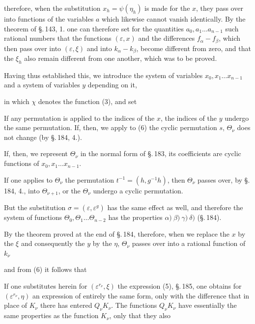 
therefore, when the substitution $x_h = \psi(\eta_h)$ is made for the $x$, they pass over into functions of the variables $a$ which likewise cannot vanish identically. By the theorem of \S.\,143, 1. one can therefore set for the quantities $a_0, a_1 \ldots a_{n-1}$ such rational numbers that the functions $(\varepsilon, x)$ and the differences $f_\alpha - f_\beta$, which then pass over into $(\varepsilon, \xi)$ and into $k_\alpha - k_\beta$, become different from zero, and that the $\xi_h$ also remain different from one another, which was to be proved.

Having thus established this, we introduce the system of variables $x_0, x_1 \ldots x_{n-1}$ and a system of variables $y$ depending on it,


in which $\chi$ denotes the function (3), and set


If any permutation is applied to the indices of the $x$, the indices of the $y$ undergo the same permutation. If, then, we apply to (6) the cyclic permutation $s$, $\Theta_\nu$ does not change (by \S.\,184, 4.).

If, then, we represent $\Theta_\nu$ in the normal form of \S.\,183, its coefficients are cyclic functions of $x_0, x_1 \ldots x_{n-1}$.

If one applies to $\Theta_\nu$ the permutation $t^{-1} = (h, g^{-1}h)$, then $\Theta_\nu$ passes over, by \S.\,184, 4., into $\Theta_{\nu+1}$, or the $\Theta_\nu$ undergo a cyclic permutation.

But the substitution $\sigma = (\varepsilon, \varepsilon^g)$ has the same effect as well, and therefore the system of functions $\Theta_0, \Theta_1 \ldots \Theta_{n-2}$ has the properties $\alpha)\ \beta)\ \gamma)\ \delta)$ (\S.\,184).

By the theorem proved at the end of \S.\,184, therefore, when we replace the $x$ by the $\xi$ and consequently the $y$ by the $\eta$, $\Theta_\nu$ passes over into a rational function of $k_\nu$


and from (6) it follows that


If one substitutes herein for $(\varepsilon^{r_\nu}, \xi)$ the expression (5), \S.\,185, one obtains for $(\varepsilon^{r_\nu}, \eta)$ an expression of entirely the same form, only with the difference that in place of $K_\nu$ there has entered $Q_\nu K_\nu$. The functions $Q_\nu K_\nu$ have essentially the same properties as the function $K_\nu$, only that they also
